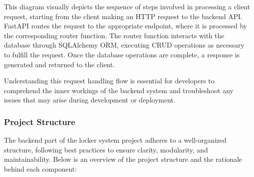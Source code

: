 This diagram visually depicts the sequence of steps involved in processing a client request, starting from the client making an HTTP request to the backend API. FastAPI routes the request to the appropriate endpoint, where it is processed by the corresponding router function. The router function interacts with the database through SQLAlchemy ORM, executing CRUD operations as necessary to fulfill the request. Once the database operations are complete, a response is generated and returned to the client.

Understanding this request handling flow is essential for developers to comprehend the inner workings of the backend system and troubleshoot any issues that may arise during development or deployment.


\subsubsection{Project Structure}

The backend part of the locker system project adheres to a well-organized structure, following best practices to ensure clarity, modularity, and maintainability. Below is an overview of the project structure and the rationale behind each component:

